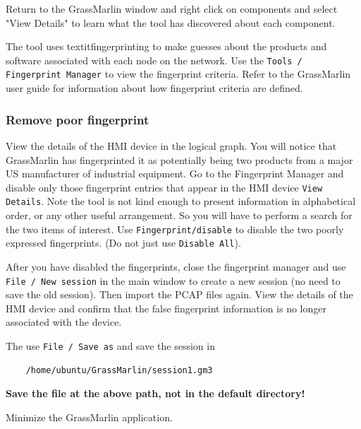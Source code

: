 Return to the GrassMarlin window and right click on components and select "View Details" to learn what the tool 
has discovered about each component.

The tool uses textit{fingerprinting} to make guesses about the products and software associated with each node on the
network.  Use the {\tt Tools / Fingerprint Manager} to view the fingerprint criteria.  Refer to the GrassMarlin user guide
for information about how fingerprint criteria are defined.

\subsubsection{Remove poor fingerprint}
View the details of the HMI device in the logical graph.  You will notice that GrassMarlin has fingerprinted it as potentially
being two products from a major US manufacturer of industrial equipment.  Go to the Fingerprint Manager and disable only those 
fingerprint entries that appear in the HMI device {\tt View Details}.  Note the tool is not kind enough to present information in
alphabetical order, or any other useful arrangement.  So you will have to perform a search for the two items of interest.
Use {\tt Fingerprint/disable} to disable the two poorly expressed fingerprints.  (Do not just use {\tt Disable All}).

After you have disabled the fingerprints, close the fingerprint manager and use {\tt File / New session} in the main window
to create a new session (no need to save the old session).  Then import the PCAP files again.  View the details of the HMI device
and confirm that the false fingerprint information is no longer associated with the device.

The use {\tt File / Save as} and save the session in
\begin{verbatim}
    /home/ubuntu/GrassMarlin/session1.gm3
\end{verbatim}
\noindent \textbf{Save the file at the above path, not in the default directory!}


Minimize the GrassMarlin application.

